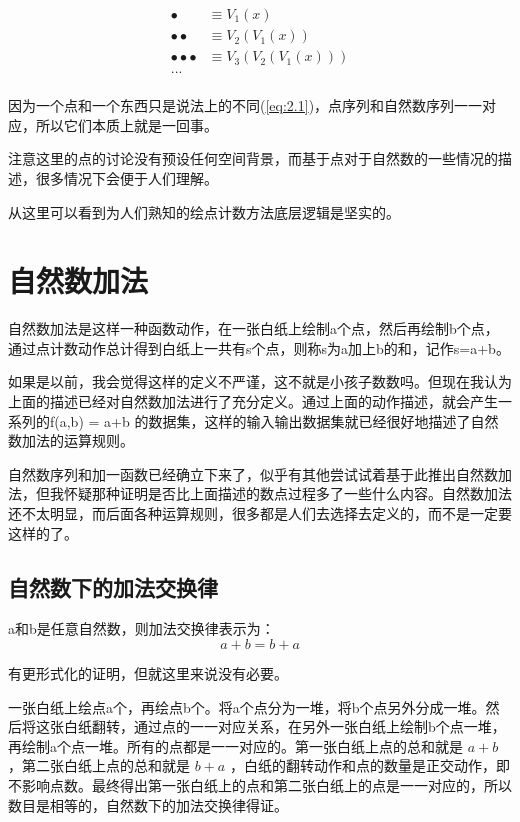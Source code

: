 \documentclass[12pt,oneside]{book}
\begin{document}
\begin{align*}
\bullet &\equiv V_1(x) \\
\bullet \bullet&\equiv V_2(V_1(x)) \\
\bullet \bullet \bullet &\equiv V_3(V_2(V_1(x))) \\
...\\
\end{align*}

因为一个点和一个东西只是说法上的不同(\ref{eq:2.1})，点序列和自然数序列一一对应，所以它们本质上就是一回事。

注意这里的点的讨论没有预设任何空间背景，而基于点对于自然数的一些情况的描述，很多情况下会便于人们理解。

从这里可以看到为人们熟知的绘点计数方法底层逻辑是坚实的。



\section{自然数加法}
自然数加法是这样一种函数动作，在一张白纸上绘制a个点，然后再绘制b个点，通过点计数动作总计得到白纸上一共有s个点，则称s为a加上b的和，记作s=a+b。

如果是以前，我会觉得这样的定义不严谨，这不就是小孩子数数吗。但现在我认为上面的描述已经对自然数加法进行了充分定义。通过上面的动作描述，就会产生一系列的f(a,b) = a+b 的数据集，这样的输入输出数据集就已经很好地描述了自然数加法的运算规则。

自然数序列和加一函数已经确立下来了，似乎有其他尝试试着基于此推出自然数加法，但我怀疑那种证明是否比上面描述的数点过程多了一些什么内容。自然数加法还不太明显，而后面各种运算规则，很多都是人们去选择去定义的，而不是一定要这样的了。


\subsection{自然数下的加法交换律}
a和b是任意自然数，则加法交换律表示为：
\begin{equation}
a+b=b+a
\end{equation}

有更形式化的证明，但就这里来说没有必要。

一张白纸上绘点a个，再绘点b个。将a个点分为一堆，将b个点另外分成一堆。然后将这张白纸翻转，通过点的一一对应关系，在另外一张白纸上绘制b个点一堆，再绘制a个点一堆。所有的点都是一一对应的。第一张白纸上点的总和就是 $a+b$ ，第二张白纸上点的总和就是 $b+a$ ，白纸的翻转动作和点的数量是正交动作，即不影响点数。最终得出第一张白纸上的点和第二张白纸上的点是一一对应的，所以数目是相等的，自然数下的加法交换律得证。
\end{document}
